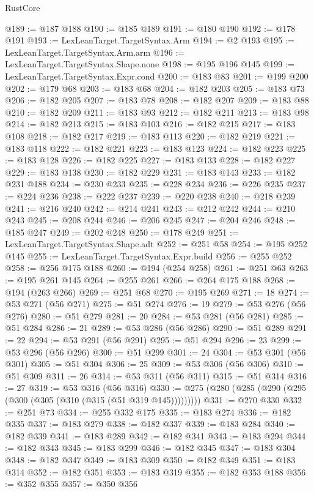 \begin{lexlean}{RustCore}
\begin{coremodule}
@189 := @187 @188
@190 := @185 @189
@191 := @180 @190
@192 := @178 @191
@193 := LexLeanTarget.TargetSyntax.Arm
@194 := @2 @193
@195 := LexLeanTarget.TargetSyntax.Arm.arm
@196 := LexLeanTarget.TargetSyntax.Shape.none
@198 := @195 @196 @145
@199 := LexLeanTarget.TargetSyntax.Expr.cond
@200 := @183 @83
@201 := @199 @200
@202 := @179 @68
@203 := @183 @68
@204 := @182 @203
@205 := @183 @73
@206 := @182 @205
@207 := @183 @78
@208 := @182 @207
@209 := @183 @88
@210 := @182 @209
@211 := @183 @93
@212 := @182 @211
@213 := @183 @98
@214 := @182 @213
@215 := @183 @103
@216 := @182 @215
@217 := @183 @108
@218 := @182 @217
@219 := @183 @113
@220 := @182 @219
@221 := @183 @118
@222 := @182 @221
@223 := @183 @123
@224 := @182 @223
@225 := @183 @128
@226 := @182 @225
@227 := @183 @133
@228 := @182 @227
@229 := @183 @138
@230 := @182 @229
@231 := @183 @143
@233 := @182 @231 @188
@234 := @230 @233
@235 := @228 @234
@236 := @226 @235
@237 := @224 @236
@238 := @222 @237
@239 := @220 @238
@240 := @218 @239
@241 := @216 @240
@242 := @214 @241
@243 := @212 @242
@244 := @210 @243
@245 := @208 @244
@246 := @206 @245
@247 := @204 @246
@248 := @185 @247
@249 := @202 @248
@250 := @178 @249
@251 := LexLeanTarget.TargetSyntax.Shape.adt
@252 := @251 @58
@254 := @195 @252 @145
@255 := LexLeanTarget.TargetSyntax.Expr.build
@256 := @255 @252
@258 := @256 @175 @188
@260 := @194 (@254 @258)
@261 := @251 @63
@263 := @195 @261 @145
@264 := @255 @261
@266 := @264 @175 @188
@268 := @194 (@263 @266)
@269 := @251 @68
@270 := @195 @269
@271 := 18
@274 := @53 @271 (@56 @271)
@275 := @51 @274
@276 := 19
@279 := @53 @276 (@56 @276)
@280 := @51 @279
@281 := 20
@284 := @53 @281 (@56 @281)
@285 := @51 @284
@286 := 21
@289 := @53 @286 (@56 @286)
@290 := @51 @289
@291 := 22
@294 := @53 @291 (@56 @291)
@295 := @51 @294
@296 := 23
@299 := @53 @296 (@56 @296)
@300 := @51 @299
@301 := 24
@304 := @53 @301 (@56 @301)
@305 := @51 @304
@306 := 25
@309 := @53 @306 (@56 @306)
@310 := @51 @309
@311 := 26
@314 := @53 @311 (@56 @311)
@315 := @51 @314
@316 := 27
@319 := @53 @316 (@56 @316)
@330 := @275 (@280 (@285 (@290 (@295 (@300 (@305 (@310 (@315 (@51 @319 @145)))))))))
@331 := @270 @330
@332 := @251 @73
@334 := @255 @332 @175
@335 := @183 @274
@336 := @182 @335
@337 := @183 @279
@338 := @182 @337
@339 := @183 @284
@340 := @182 @339
@341 := @183 @289
@342 := @182 @341
@343 := @183 @294
@344 := @182 @343
@345 := @183 @299
@346 := @182 @345
@347 := @183 @304
@348 := @182 @347
@349 := @183 @309
@350 := @182 @349
@351 := @183 @314
@352 := @182 @351
@353 := @183 @319
@355 := @182 @353 @188
@356 := @352 @355
@357 := @350 @356

\end{coremodule}
\end{lexlean}
